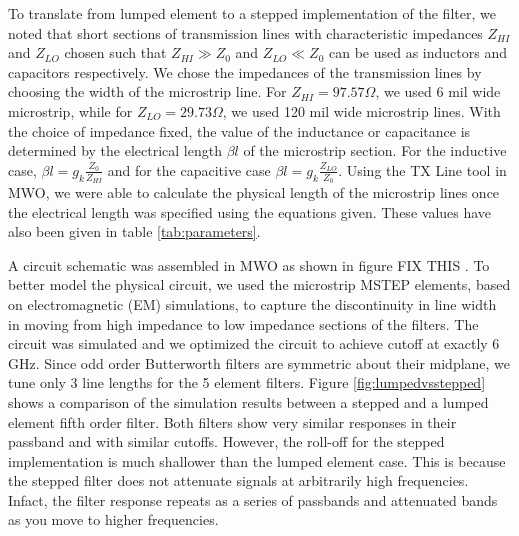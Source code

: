 \documentclass[twocolumn, aps, floatfix]{revtex4-1}
\begin{document}
To translate from lumped element to a stepped implementation of the filter, we noted that short sections of transmission lines with characteristic impedances $Z_{HI}$ and $Z_{LO}$ chosen such that $Z_{HI} \gg Z_0$ and $Z_{LO} \ll Z_0$ can be used as inductors and capacitors respectively. We chose the impedances of the transmission lines by choosing the width of the microstrip line. For $Z_{HI} = 97.57 \Omega$, we used 6 mil wide microstrip, while for $Z_{LO} = 29.73 \Omega$, we used 120 mil wide microstrip lines. With the choice of impedance fixed, the value of the inductance or capacitance is determined by the electrical length $\beta l$ of the microstrip section. For the inductive case, $\beta l = g_k \frac{Z_0}{Z_{HI}}$ and for the capacitive case $\beta l = g_k \frac{Z_{LO}}{Z_0} $. Using the TX Line tool in MWO, we were able to calculate the physical length of the microstrip lines once the electrical length was specified using the equations given. These values have also been given in table \ref{tab:parameters}. 


A circuit schematic was assembled in MWO as shown in figure FIX THIS . To better model the physical circuit, we used the microstrip MSTEP elements, based on electromagnetic (EM) simulations, to capture the discontinuity in line width in moving from high impedance to low impedance sections of the filters. The circuit was simulated and we optimized the circuit to achieve cutoff at exactly 6 GHz. Since odd order Butterworth filters are symmetric about their midplane, we tune only 3 line lengths for the 5 element filters. Figure \ref{fig:lumpedvsstepped} shows a comparison of the simulation results between a stepped and a lumped element fifth order filter. Both filters show very similar responses in their passband and with similar cutoffs. However, the roll-off for the stepped implementation is much shallower than the lumped element case. This is because the stepped filter does not attenuate signals at arbitrarily high frequencies. Infact, the filter response repeats as a series of passbands and attenuated bands as you move to higher frequencies. 

\end{document}
